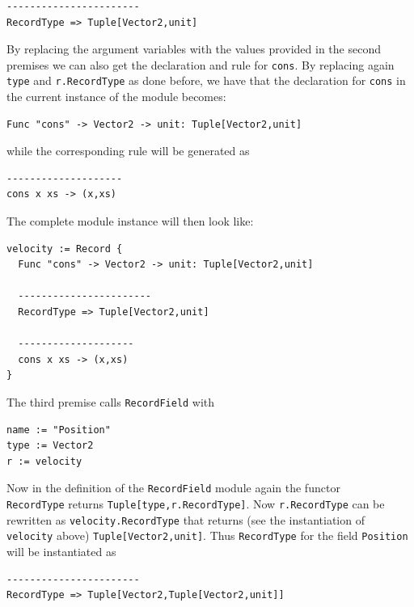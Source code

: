 \begin{lstlisting}
-----------------------
RecordType => Tuple[Vector2,unit]
\end{lstlisting}

By replacing the argument variables with the values provided in the second premises we can also get the declaration and rule for \texttt{cons}. By replacing again \texttt{type} and \texttt{r.RecordType} as done before, we have that the declaration for \texttt{cons} in the current instance of the module becomes:

\begin{lstlisting}
Func "cons" -> Vector2 -> unit: Tuple[Vector2,unit]
\end{lstlisting}

\noindent
while the corresponding rule will be generated as

\begin{lstlisting}
--------------------
cons x xs -> (x,xs)
\end{lstlisting}

\noindent
The complete module instance will then look like:

\begin{lstlisting}
velocity := Record {
  Func "cons" -> Vector2 -> unit: Tuple[Vector2,unit]
  
  -----------------------
  RecordType => Tuple[Vector2,unit]
  
  --------------------
  cons x xs -> (x,xs)
}
\end{lstlisting}

The third premise calls \texttt{RecordField} with 

\begin{lstlisting}
name := "Position"
type := Vector2
r := velocity
\end{lstlisting}

\noindent
Now in the definition of the \texttt{RecordField} module again the functor\\ \texttt{RecordType} returns \texttt{Tuple[type,r.RecordType]}. Now \texttt{r.RecordType} can be rewritten as \texttt{velocity.RecordType} that returns (see the instantiation of \texttt{velocity} above) \texttt{Tuple[Vector2,unit]}. Thus \texttt{RecordType} for the field \texttt{Position} will be instantiated as

\begin{lstlisting}
-----------------------
RecordType => Tuple[Vector2,Tuple[Vector2,unit]]
\end{lstlisting}

